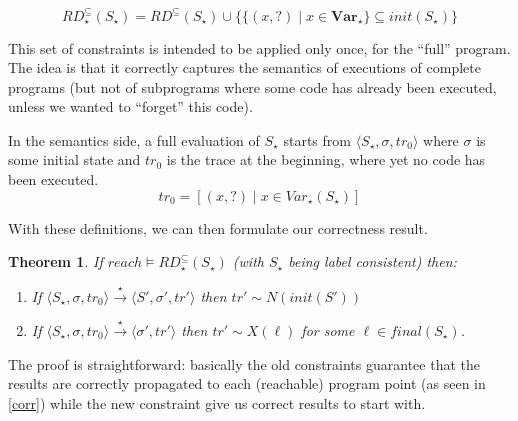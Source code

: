 \documentclass[a4wide,12pt]{article}
\theoremstyle{definition}
\theoremstyle{plain}
\newtheorem{theo}{Theorem}
\theoremstyle{remark}
\def\const#1{\mathopen{\langle}#1\mathclose{\rangle}} %
\def\pair#1{\const{#1}}
\def\Var {\mathbf{Var}}
\def\starto{\overset{\star}{\to}}
\begin{document}
\[RD^\subseteq_\star(S_\star) = RD^\subseteq(S_\star) \cup \{ \{(x,?) \mid x \in \Var_\star\} \subseteq init(S_\star) \}\]

This set of constraints is intended to be applied only once, for the ``full'' program.
The idea is that it correctly captures the semantics of executions of complete programs
(but not of subprograms where some code has already been executed, unless we wanted to ``forget''
this code).

In the semantics side, a full evaluation of $S_\star$ starts from $\pair{S_\star,\sigma,tr_0}$
where $\sigma$ is some initial state and $tr_0$ is the trace at the beginning, where yet no code
has been executed.
\[tr_0 = [ (x,?) \mid x \in Var_\star(S_\star) ] \]

With these definitions, we can then formulate our correctness result.
\begin{theo}
If $reach \models RD_\star^\subseteq(S_\star)$ (with $S_\star$ being label consistent) then:

\begin{enumerate}
\item If $\pair{S_\star, \sigma, tr_0} \starto \pair{S', \sigma', tr'}$ then $ tr' \sim
N(init(S'))$ 
\item If $\pair{S_\star, \sigma, tr_0} \starto \pair{\sigma', tr'}$ then $ tr' \sim
X(\ell)$ for some $\ell \in final(S_\star)$.
\end{enumerate}
\end{theo}
 
The proof is straightforward: basically the old constraints guarantee that the results are correctly propagated to each (reachable)
program point (as seen in \ref{corr}) while the new constraint give us correct results to start with.
\end{document}
